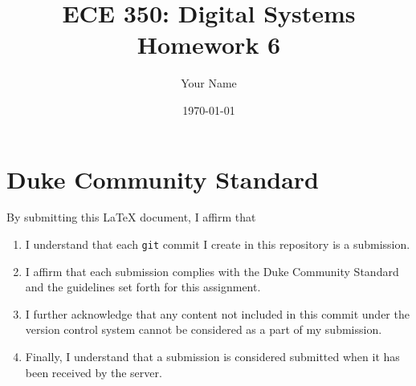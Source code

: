 \documentclass[letterpaper]{article} %
\begin{document}
\title{ECE 350: Digital Systems Homework 6}
\author{Your Name} %
\date{\today} %
\maketitle

\section*{Duke Community Standard}

By submitting this \LaTeX{} document, I affirm that
\begin{enumerate}
    \item I understand that each \texttt{git} commit I create in this repository is a submission.
    \item I affirm that each submission complies with the Duke Community Standard and the guidelines set forth for this assignment.
    \item I further acknowledge that any content not included in this commit under the version control system cannot be considered as a part of my submission.
    \item Finally, I understand that a submission is considered submitted when it has been received by the server.
\end{enumerate}
\end{document}
